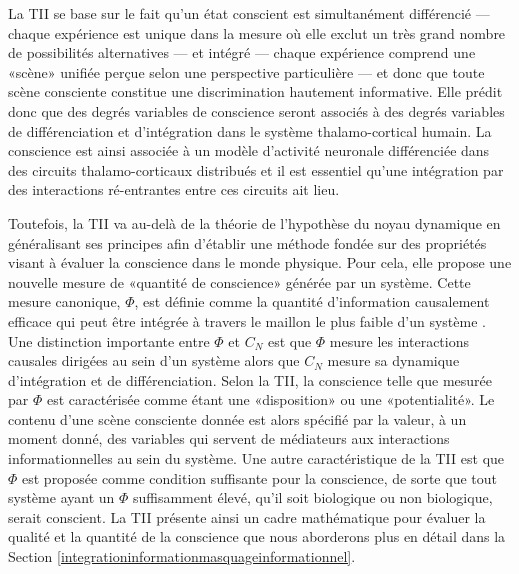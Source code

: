 La TII se base sur le fait qu'un état conscient est simultanément différencié --- chaque expérience est unique dans la mesure où elle exclut un très grand nombre de possibilités alternatives --- et intégré --- chaque expérience comprend une «scène» unifiée perçue selon une perspective particulière --- et donc que toute scène consciente constitue une discrimination hautement informative. 
Elle prédit donc que des degrés variables de conscience seront associés à des degrés variables de différenciation et d'intégration dans le système thalamo-cortical humain. 
La conscience est ainsi associée à un modèle d'activité neuronale différenciée dans des circuits thalamo-corticaux distribués et il est essentiel qu'une intégration par des interactions ré-entrantes entre ces circuits ait lieu.

Toutefois, la TII va au-delà de la théorie de l'hypothèse du noyau dynamique en généralisant ses principes afin d'établir une méthode fondée sur des propriétés visant à évaluer la conscience dans le monde physique. 
Pour cela, elle propose une nouvelle mesure de «quantité de conscience» générée par un système. 
Cette mesure canonique, $\Phi$, est définie comme la quantité d'information causalement efficace qui peut être intégrée à travers le maillon le plus faible d'un système \citep{tononi2003measuring, tononi2004information}. 
Une distinction importante entre $\Phi$ et $C_N$ est que $\Phi$ mesure les interactions causales dirigées au sein d'un système alors que $C_N$ mesure sa dynamique d'intégration et de différenciation. 
Selon la TII, la conscience telle que mesurée par $\Phi$ est caractérisée comme étant une «disposition» ou une «potentialité». 
Le contenu d'une scène consciente donnée est alors spécifié par la valeur, à un moment donné, des variables qui servent de médiateurs aux interactions informationnelles au sein du système. 
Une autre caractéristique de la TII est que $\Phi$ est proposée comme condition suffisante pour la conscience, de sorte que tout système ayant un $\Phi$ suffisamment élevé, qu'il soit biologique ou non biologique, serait conscient. 
La TII présente ainsi un cadre mathématique pour évaluer la qualité et la quantité de la conscience \citep{oizumi2014phenomenology, tononi2012integrated, tononi2015integrated, tononi2015consciousness} que nous aborderons plus en détail dans la Section \ref{integrationinformationmasquageinformationnel}. \\

